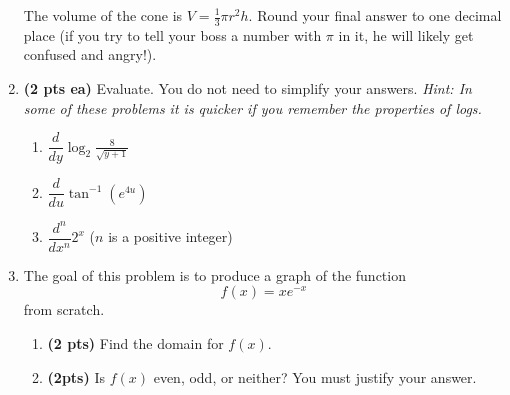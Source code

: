 \documentclass[12pt,letterpaper]{article}
\begin{document}
\begin{enumerate}[1.]
\vspace{1pc}The volume of the cone is $V=\frac{1}{3}\pi r^2h$.  Round your final answer to one decimal place (if you try to tell your boss a number with $\pi$ in it, he will likely get confused and angry!).

\newpage
\item {\bf (2 pts ea)} Evaluate.  You do not need to simplify your answers. {\it Hint: In some of these problems it is quicker if you remember the properties of logs.} 

	\begin{enumerate}
	\item $\displaystyle \dfrac{d}{dy}\log_2{\frac{8}{\sqrt{y+1}}}$
		
	
	
	\vspace{15pc}
	\item $\displaystyle \dfrac{d}{du}\tan^{-1}\left(e^{4u}\right)$
	
	\vspace{15pc}
	\item $\displaystyle \dfrac{d^n}{dx^n}2^x$ \hspace{3ex}($n$ is a positive integer)
	
	\end{enumerate}
	
\newpage
\item The goal of this problem is to produce a graph of the function
\[f(x)=xe^{-x}\]
from scratch.
	
	\begin{enumerate}
	\item {\bf (2 pts)} Find the domain for $f(x)$.
	
	\vspace{8pc}
	\item {\bf (2pts)} Is $f(x)$ even, odd, or neither?  You must justify your answer.
	

\end{enumerate}
\end{enumerate}
\end{document}
